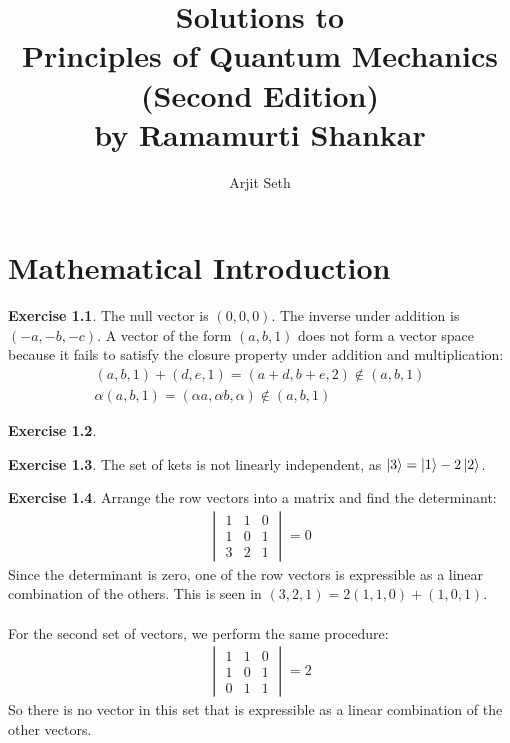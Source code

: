 \documentclass{report}
\theoremstyle{definition}
\newtheorem{chapter1}{Exercise}
\begin{document}
\title{Solutions to \\Principles of Quantum Mechanics \\ (Second Edition)\\ by Ramamurti Shankar}
\date{}
\author{Arjit Seth}

\maketitle

\chapter{Mathematical Introduction}

\begin{chapter1}\label{prob:1}
	The null vector is $(0,0,0)$. The inverse under addition is $(-a,-b,-c)$. A vector of the form $(a,b,1)$ does not form a vector space because it fails to satisfy the closure property under addition and multiplication:
	\begin{gather*}
		(a,b,1) + (d,e,1) = (a+d, b+e, 2) \notin (a,b,1) \\
		\alpha(a,b,1) = (\alpha a, \alpha b, \alpha) \notin (a,b,1)
	\end{gather*}
	
\end{chapter1}

\begin{chapter1}\label{prob:2}
	
\end{chapter1}

\begin{chapter1}\label{prob:3}
	The set of kets is not linearly independent, as $\ket 3 = \ket 1 -2\ket 2$.
\end{chapter1}

\begin{chapter1}\label{prob:4}
	Arrange the row vectors into a matrix and find the determinant:
		\begin{gather*}
			\begin{vmatrix}
				1 & 1 & 0 \\
				1 & 0 & 1 \\
				3 & 2 & 1 
			\end{vmatrix}
			= 0
		\end{gather*}
		Since the determinant is zero, one of the row vectors is expressible as a linear combination of the others. This is seen in $(3,2,1) = 2(1,1,0) + (1,0,1)$. \\\\
		For the second set of vectors, we perform the same procedure:
		\begin{gather*}
			\begin{vmatrix}
				1 & 1 & 0 \\
				1 & 0 & 1 \\
				0 & 1 & 1
			\end{vmatrix}
			= 2
		\end{gather*}
		So there is no vector in this set that is expressible as a linear combination of the other vectors.\\\\
\end{chapter1}
\end{document}

